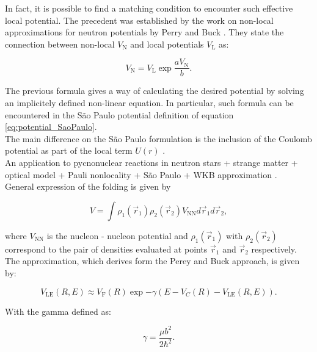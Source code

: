 \documentclass[openany]{book}
\begin{document}
In fact, it is possible to find a matching condition to encounter such effective local potential. The precedent was established by the work on non-local approximations for neutron potentials by Perry and Buck \cite{perey_buck_1962}. They state the connection between non-local $V_{\mathrm{N}}$ and local potentials $V_{\mathrm{L}}$ as:

\begin{equation}\label{eq:nonLocality_connection}
	V_{\mathrm{N}} = V_{\mathrm{L}} \exp{\frac{a V_{\mathrm{N}}}{b}}.
\end{equation}

The previous formula gives a way of calculating the desired potential by solving an implicitely defined non-linear equation. In particular, such formula can be encountered in the São Paulo potential definition of equation \ref{eq:potential_SaoPaulo}. \\

The main difference on the São Paulo formulation is the inclusion of the Coulomb potential as part of the local term $U(r)$ . \\

An application to pycnonuclear reactions in neutron stars + strange matter + optical model + Pauli nonlocality + São Paulo  + WKB approximation \cite{golf_hellmers_weber_2009}.\\ 


General expression of the folding is given by

\begin{equation}\label{potential_nonLocal_folding}
	V = \int \rho_1(\vec r_1) \rho_2(\vec r_2) V_\mathrm{NN} d\vec r_1 d\vec r_2,
\end{equation}

where $V_\mathrm{NN}$ is the nucleon - nucleon potential and $\rho_1(\vec r_1)$ with  $\rho_2(\vec r_2)$ correspond to the pair of densities evaluated at points $\vec r_1$ and $\vec r_2$ respectively. \\

The approximation, which derives form the Perey and Buck approach, is given by: 

\begin{equation}\label{potential_nonLocal_LE}
	V_\mathrm{LE}(R, E) \approx V_\mathrm{F}(R) \exp {-\gamma (E - V_C(R) -V_\mathrm{LE}(R, E))}.
\end{equation}

With the gamma defined as:

\begin{equation}\label{potential_nonLocal_b}
	\gamma = \frac{\mu b^2}{2\hbar^2}.
\end{equation}
\end{document}
